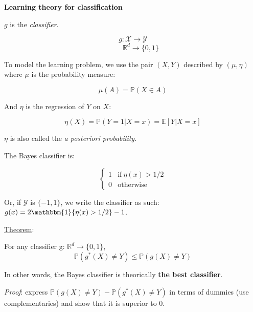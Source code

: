 {\fontsize{12pt}{22pt} \textbf{Learning theory for classification}\par}

\vspace{5mm}

$g$ is the \textit{classifier}.

$$g: \mathcal{X} \to \mathcal{Y}$$
$$~~~~~~~~~~\mathbb{R}^d \to \{0,1\}$$

To model the learning problem, we use the pair $(X,Y)$ described by $(\mu, \eta)$ where $\mu$ is the probability measure:

$$\mu(A) = \mathbb{P}(X \in A)$$

And $\eta$ is the regression of $Y$ on $X$:

$$\eta(X) = \mathbb{P}(Y=1 | X=x) = \mathbb{E}[Y | X=x]$$

$\eta$ is also called the \textit{a posteriori probability}.

The Bayes classifier is:

  \begin{equation}
    \begin{cases}
      1 & \text{if}\ \eta(x) > 1/2 \\
      0 & \text{otherwise}
    \end{cases}
  \end{equation}

Or, if $\mathcal{Y}$ is $\{-1,1\}$, we write the classifier as such: $g(x) = 2 \mathbbm{1}\{ \eta(x)>1/2\}-1$.

\vspace{5mm}

\underline{Theorem}:

\vspace{5mm}

For any classifier g: $\mathbb{R}^d \to \{0,1\}$,
$$\mathbb{P}(g^*(X) \neq Y) \le \mathbb{P}(g(X) \neq Y)$$

In other words, the Bayes classifier is theorically \textbf{the best classifier}.

\vspace{5mm}

\textit{Proof}: express $\mathbb{P}(g(X) \neq Y) - \mathbb{P}(g^*(X) \neq Y)$ in terms of dummies (use complementaries) and show that it is superior to 0.

\vspace{5mm}